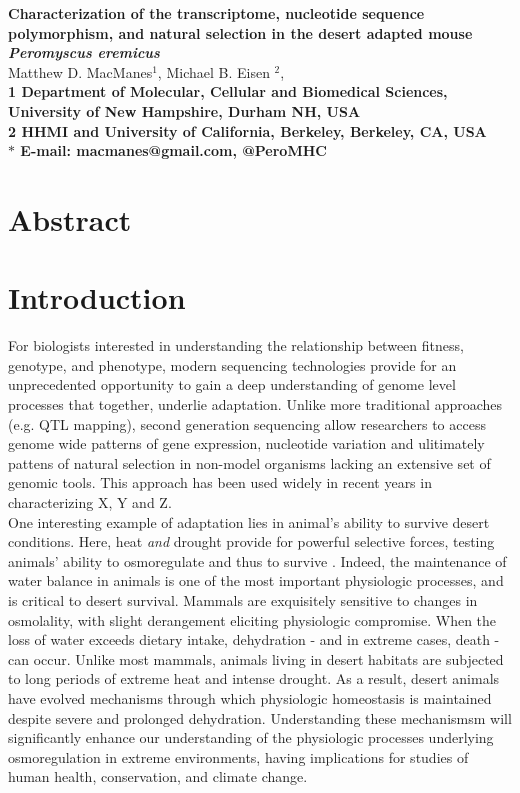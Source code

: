 \documentclass[11pt]{article}
\date{}
\begin{document}
\begin{flushleft}
{\Large
\textbf{Characterization of the transcriptome, nucleotide sequence polymorphism, and natural selection in the desert adapted mouse \textit{Peromyscus eremicus}}
}
\\
Matthew D. MacManes$^{1}$, 
Michael B. Eisen $^{2}$, 
\\
\bf{1} Department of Molecular, Cellular and Biomedical Sciences, University of New Hampshire, Durham NH, USA
\\
\bf{2} HHMI and University of California, Berkeley, Berkeley, CA, USA
\\
$\ast$ E-mail: macmanes@gmail.com, @PeroMHC
\end{flushleft}

\linenumbers

\section*{Abstract}



\section*{Introduction}

For biologists interested in understanding the relationship between fitness, genotype, and phenotype, modern sequencing technologies provide for an unprecedented opportunity to gain a deep understanding of genome level processes that together, underlie adaptation. Unlike more traditional approaches (e.g. QTL mapping), second generation sequencing allow researchers to access genome wide patterns of gene expression, nucleotide variation and ulitimately pattens of natural selection in non-model organisms lacking an extensive set of genomic tools. This approach has been used widely in recent years in characterizing X, Y and Z. \\

One interesting example of adaptation lies in animal's ability to survive desert conditions. Here, heat \emph{and} drought provide for powerful selective forces, testing animals' ability to osmoregulate and thus to survive \cite{Walsberg:2000uu}. Indeed, the maintenance of water balance in animals is one of the most important physiologic processes, and is critical to desert survival. Mammals are exquisitely sensitive to changes in osmolality, with slight derangement eliciting physiologic compromise.  When the loss of water exceeds dietary intake, dehydration - and in extreme cases, death - can occur.  Unlike most mammals, animals living in desert habitats are subjected to long periods of extreme heat and intense drought.  As a result, desert animals have evolved mechanisms through which physiologic homeostasis is maintained despite severe and prolonged dehydration. Understanding these mechanismsm will significantly enhance our understanding of the physiologic processes underlying osmoregulation in extreme environments, having implications for studies of human health, conservation, and climate change. \\
\end{document}
